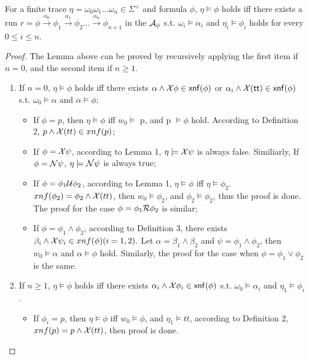 \begin{lemma}\label{lem:finiteSat}
For a finite trace $\eta = \omega_0\omega_1\ldots \omega_n \in \Sigma^{+}$ and \ltlf formula $\phi$, $\eta \models \phi$ holds iff there exists a run $r = \phi \overset{\alpha_0}{\rightarrow}\phi_1\overset{\alpha_1}{\rightarrow}\phi_2...\overset{\alpha_n}{\rightarrow}\phi_{n+1}$ in the \NFA $\mathcal{A}_{\phi}$ s.t. $\omega_i \models \alpha_i$ and $\eta_i \models \phi_i $ holds for every $0 \leq i \leq n$.
\end{lemma}
\begin{proof}
The Lemma above can be proved by recursively applying the first item if $n = 0$, and the second item if $n \geq 1$. 
\begin{enumerate}
	\item If $n = 0$, $\eta \models \phi$ holds iff there exists $\alpha \wedge \mathcal{X}\phi \in {\sf xnf}(\phi)$ or $\alpha_i \wedge \mathcal{X}({\sf tt}) \in {\sf xnf}(\phi)$ s.t. $\omega_0 \models \alpha$ and $\alpha \models \phi$;
	\begin{itemize}
		\item If $\phi = p$, then $\eta \models \phi$ iff $w_0 \models$ p, and p $\models \phi$ hold. According to Definition 2, $p \wedge \mathcal{X}(tt) \in xnf(p)$;
		\item If $\phi=\mathcal{X} \psi$, according to Lemma 1, $\eta \models \mathcal{X} \psi$ is always false. Similiarly, If $\phi=\mathcal{N} \psi$, $\eta \models \mathcal{N} \psi$ is always true;
		\item If $\phi=\phi_{1} \mathcal{U} \phi_{2}$, according to Lemma 1, $\eta \models \phi$ iff $\eta \models \phi_{2}$. $xnf(\phi_{2})=\phi_{2} \wedge \mathcal{X}(tt)$, then  $w_0 \models \phi_{2}$, and $\phi_{2} \models \phi_{2}$, thus the proof is done. The proof for the case $\phi=\phi_{1} \mathcal{R} \phi_{2}$ is similar;
		\item If $\phi=\phi_{1} \wedge \phi_{2}$, according to Definition 3, there exists $\beta_i \wedge \mathcal{X}\psi_i \in xnf(\phi)(i = 1,2).$ Let $\alpha = \beta_1 \wedge \beta_2$ and $\psi = \phi_1 \wedge \phi_2$, then $w_0 \models \alpha$ and $\alpha \models \phi$ hold. Similarly, the proof for the case when $\phi = \phi_1 \vee \phi_2$ is the same.
	\end{itemize}
	\item  If $n \geq 1$, $\eta \models \phi$ holds iff there exists $\alpha_i \wedge \mathcal{X}\phi_i \in {\sf xnf}(\phi)$ s.t. $\omega_0 \models \alpha_i$ and $\eta_1 \models \phi_i$.
	\begin{itemize}
		\item If $\phi_i = p$, then $\eta \models \phi$ iff $w_0 \models \phi$, and $\eta_1 \models tt$, according to Definition 2, $xnf(p)=p \wedge \mathcal{X}(tt)$, then proof is done.\\

\end{itemize}
\end{enumerate}
\end{proof}
